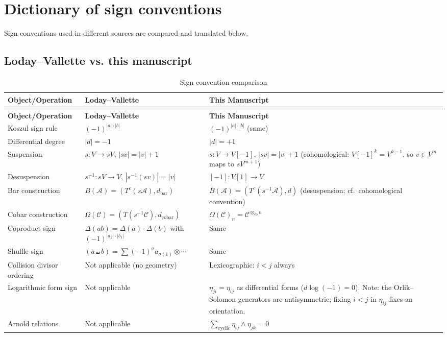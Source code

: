 \chapter{Dictionary of sign conventions}
\label{app:sign-conventions}


Sign conventions used in different sources are compared and translated below.

\section{Loday--Vallette vs. this manuscript}

\begin{center}
\begin{longtable}{|>{\raggedright\arraybackslash}p{5.8cm}|>{\raggedright\arraybackslash}p{3.9cm}|>{\raggedright\arraybackslash}p{3.9cm}|}
\caption{Sign convention comparison} \\
\hline
\textbf{Object/Operation} & \textbf{Loday--Vallette \cite{LV12}} & \textbf{This Manuscript} \\
\hline
\endfirsthead
\multicolumn{3}{c}{\tablename\ \thetable\ -- \textit{Continued}} \\
\hline
\textbf{Object/Operation} & \textbf{Loday--Vallette} & \textbf{This Manuscript} \\
\hline
\endhead
\hline
\endfoot
\hline
\endlastfoot
Koszul sign rule & $(-1)^{|a| \cdot |b|}$ & $(-1)^{|a| \cdot |b|}$ (same) \\
Differential degree & $|d| = -1$ & $|d| = +1$ \\
Suspension & $s: V \to sV$, $|sv| = |v| + 1$ & $s: V \to V[-1]$, $|sv| = |v| + 1$ (cohomological: $V[-1]^k = V^{k-1}$, so $v \in V^m$ maps to $sV^{m+1}$) \\
Desuspension & $s^{-1}: sV \to V$, $|s^{-1}(sv)| = |v|$ & $[-1]: V[1] \to V$ \\
Bar construction & $B(\mathcal{A}) = (T^c(s\mathcal{A}), d_{\text{bar}})$ & $\bar{B}(\mathcal{A}) = (T^c(s^{-1}\bar{\mathcal{A}}), d)$ (desuspension; cf.\ cohomological convention) \\
Cobar construction & $\Omega(\mathcal{C}) = (T(s^{-1}\mathcal{C}), d_{\text{cobar}})$ & $\Omega(\mathcal{C})_n = \mathcal{C}^{\otimes_{\text{co}} n}$ \\
Coproduct sign & $\Delta(ab) = \Delta(a) \cdot \Delta(b)$ with $(-1)^{|a_2| \cdot |b_1|}$ & Same \\
Shuffle sign & $(a \shuffle b) = \sum (-1)^{\sigma} a_{\sigma(1)} \otimes \cdots$ & Same \\
Collision divisor ordering & Not applicable (no geometry) & Lexicographic: $i < j$ always \\
Logarithmic form sign & Not applicable & $\eta_{ji} = \eta_{ij}$ as differential forms ($d\log(-1)=0$). Note: the Orlik--Solomon generators are antisymmetric; fixing $i < j$ in $\eta_{ij}$ fixes an orientation. \\
Arnold relations & Not applicable & $\sum_{\text{cyclic}} \eta_{ij} \wedge \eta_{jk} = 0$ \\
\end{longtable}
\end{center}

